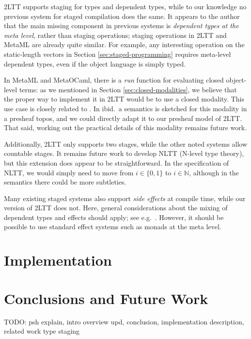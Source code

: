 \documentclass[acmsmall]{acmart}
\newcommand{\mbb}[1]{\mathbb{#1}}
\theoremstyle{remark}
\begin{document}
2LTT supports staging for types and dependent types, while to our knowledge no
previous system for staged compilation does the same. It appears to the author
that the main missing component in previous systems is \emph{dependent types at
the meta level}, rather than staging operations; staging operations in 2LTT and
MetaML are already quite similar. For example, any interesting operation on
the static-length vectors in Section \ref{sec:staged-programming} requires
meta-level dependent types, even if the object language is simply typed.

In MetaML and MetaOCaml, there is a \emph{run} function for evaluating closed
object-level terms: as we mentioned in Section \ref{sec:closed-modalities}, we
believe that the proper way to implement it in 2LTT would be to use a closed
modality. This use case is closely related to \cite{licata2018internal}. In
ibid.\ a semantics is sketched for this modality in a presheaf topos, and we
could directly adapt it to our presheaf model of 2LTT. That said, working
out the practical details of this modality remains future work.

Additionally, 2LTT only supports two stages, while the other noted systems allow
countable stages. It remains future work to develop NLTT (N-level type theory),
but this extension does appear to be straightforward. In the specification of
NLTT, we would simply need to move from $i \in \{0,1\}$ to $i \in \mbb{N}$,
although in the semantics there could be more subtleties.

Many existing staged systems also support \emph{side effects} at compile time,
while our version of 2LTT does not. Here, general considerations about the
mixing of dependent types and effects should apply; see
e.g.\ \cite{fire-triangle}. However, it should be possible to use standard
effect systems such as monads at the meta level.

\section{Implementation}\label{sec:implementation}

\section{Conclusions and Future Work}\label{sec:conclusions}

TODO: psh explain, intro overview upd, conclusion, implementation description, related work type staging




\end{document}
